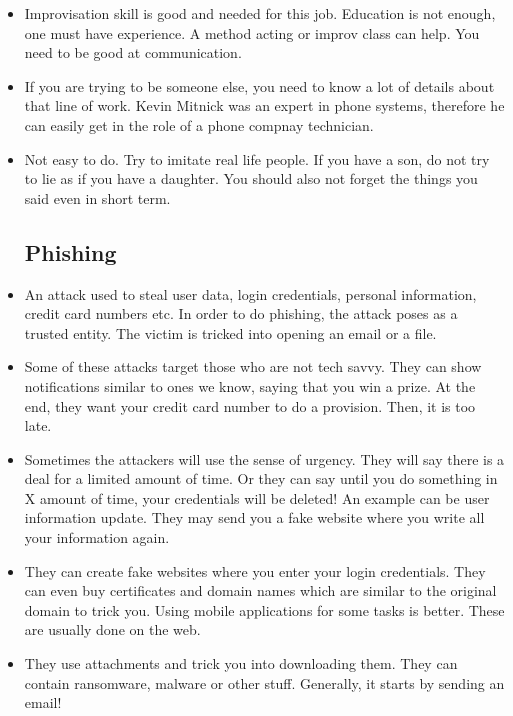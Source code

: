 \documentclass[12pt]{article}
\newcommand{\blue}[1]{{\color{blue} #1}}
\begin{document}
\begin{itemize}[itemsep=3em]
	\item Improvisation skill is good and needed for this job. Education is not enough, one must have experience. A method acting or improv class can help. You need to be good at communication.
	
	\item If you are trying to be someone else, you need to know a lot of details about that line of work. Kevin Mitnick was an expert in phone systems, therefore he can easily get in the role of a phone compnay technician.
	
	\item Not easy to do. Try to imitate real life people. If you have a son, do not try to lie as if you have a daughter. You should also not forget the things you said even in short term.

	\subsection{Phishing}
	
	\item An attack used to steal user data, login credentials, personal information, credit card numbers etc. In order to do phishing, the attack poses as a trusted entity. The victim is tricked into opening an email or a file. 
	
	\item Some of these attacks target those who are not tech savvy. They can show notifications similar to ones we know, saying that you win a prize. At the end, they want your credit card number to do a provision. Then, it is too late.
	
	\item Sometimes the attackers will use the sense of urgency. They will say there is a deal for a limited amount of time. Or they can say until you do something in X amount of time, your credentials will be deleted! \small \blue{An example can be user information update. They may send you a fake website where you write all your information again.}
	
	\LARGE
	
	\item They can create fake websites where you enter your login credentials. They can even buy certificates and domain names which are similar to the original domain to trick you. Using mobile applications for some tasks is better. These are usually done on the web.
	
	\item They use attachments and trick you into downloading them. They can contain ransomware, malware or other stuff. Generally, it starts by sending an email!
	

\end{itemize}
\end{document}
